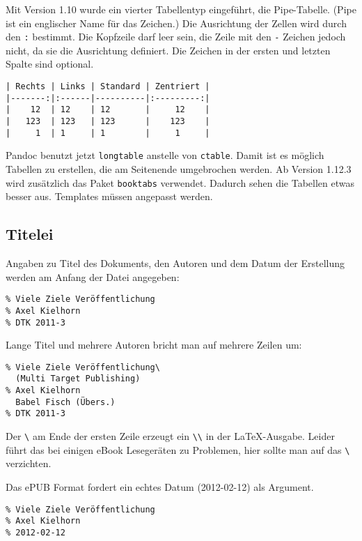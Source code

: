 \documentclass[11pt,ngerman,a4paper]{article}
\begin{document}
Mit Version 1.10 wurde ein vierter Tabellentyp eingeführt, die
Pipe-Tabelle. (Pipe ist ein englischer Name für das \texttt{\textbar{}}
Zeichen.) Die Ausrichtung der Zellen wird durch den \texttt{:} bestimmt.
Die Kopfzeile darf leer sein, die Zeile mit den \texttt{-} Zeichen
jedoch nicht, da sie die Ausrichtung definiert. Die \texttt{\textbar{}}
Zeichen in der ersten und letzten Spalte sind optional.

\begin{verbatim}
| Rechts | Links | Standard | Zentriert | 
|-------:|:------|----------|:---------:| 
|    12  | 12    | 12       |     12    | 
|   123  | 123   | 123      |    123    |
|     1  | 1     | 1        |     1     |
\end{verbatim}

Pandoc benutzt jetzt \texttt{longtable} anstelle von \texttt{ctable}.
Damit ist es möglich Tabellen zu erstellen, die am Seitenende
umgebrochen werden. Ab Version 1.12.3 wird zusätzlich das Paket
\texttt{booktabs} verwendet. Dadurch sehen die Tabellen etwas besser
aus. Templates müssen angepasst werden.

\subsection{Titelei}\label{titelei}

Angaben zu Titel des Dokuments, den Autoren und dem Datum der Erstellung
werden am Anfang der Datei angegeben:

\begin{verbatim}
% Viele Ziele Veröffentlichung
% Axel Kielhorn
% DTK 2011-3
\end{verbatim}

Lange Titel und mehrere Autoren bricht man auf mehrere Zeilen um:

\begin{verbatim}
% Viele Ziele Veröffentlichung\
  (Multi Target Publishing)
% Axel Kielhorn
  Babel Fisch (Übers.)
% DTK 2011-3
\end{verbatim}

Der \texttt{\textbackslash{}} am Ende der ersten Zeile erzeugt ein
\texttt{\textbackslash{}\textbackslash{}} in der LaTeX-Ausgabe. Leider
führt das bei einigen eBook Lesegeräten zu Problemen, hier sollte man
auf das \texttt{\textbackslash{}} verzichten.

Das ePUB Format fordert ein echtes Datum (2012-02-12) als Argument.

\begin{verbatim}
% Viele Ziele Veröffentlichung
% Axel Kielhorn
% 2012-02-12
\end{verbatim}
\end{document}
